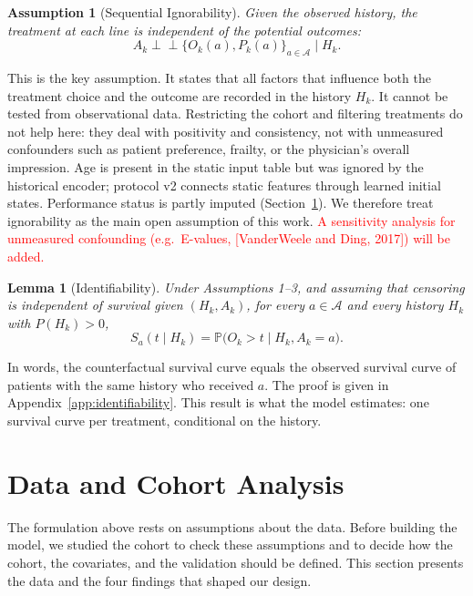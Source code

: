 \documentclass[a4paper,10pt]{article}
\newtheorem{assumption}{Assumption}
\newtheorem{lemma}{Lemma}
\newcommand{\todo}[1]{\textcolor{red}{#1}}
\begin{document}
\begin{assumption}[Sequential Ignorability]
Given the observed history, the treatment at each line is independent of the potential outcomes:
\begin{equation}
    A_k \perp\!\!\!\perp \{O_k(a), P_k(a)\}_{a \in \mathcal{A}} \mid H_k.
\end{equation}
\end{assumption}
This is the key assumption. It states that all factors that influence both the treatment choice and the outcome are recorded in the history $H_k$. It cannot be tested from observational data. Restricting the cohort and filtering treatments do not help here: they deal with positivity and consistency, not with unmeasured confounders such as patient preference, frailty, or the physician's overall impression. Age is present in the static input table but was ignored by the historical encoder; protocol v2 connects static features through learned initial states. Performance status is partly imputed (Section~\ref{sec:data}). We therefore treat ignorability as the main open assumption of this work. \todo{A sensitivity analysis for unmeasured confounding (e.g.\ E-values, [VanderWeele and Ding, 2017]) will be added.}

\begin{lemma}[Identifiability]
\label{lem:identifiability}
Under Assumptions 1--3, and assuming that censoring is independent of survival given $(H_k, A_k)$, for every $a \in \mathcal{A}$ and every history $H_k$ with $P(H_k) > 0$,
\begin{equation}
    S_a(t \mid H_k) = \mathbb{P}\big(O_k > t \mid H_k, A_k = a\big).
\end{equation}
\end{lemma}
In words, the counterfactual survival curve equals the observed survival curve of patients with the same history who received $a$. The proof is given in Appendix~\ref{app:identifiability}. This result is what the model estimates: one survival curve per treatment, conditional on the history.

\section{Data and Cohort Analysis}
\label{sec:data}

The formulation above rests on assumptions about the data. Before building the model, we studied the cohort to check these assumptions and to decide how the cohort, the covariates, and the validation should be defined. This section presents the data and the four findings that shaped our design.
\end{document}
